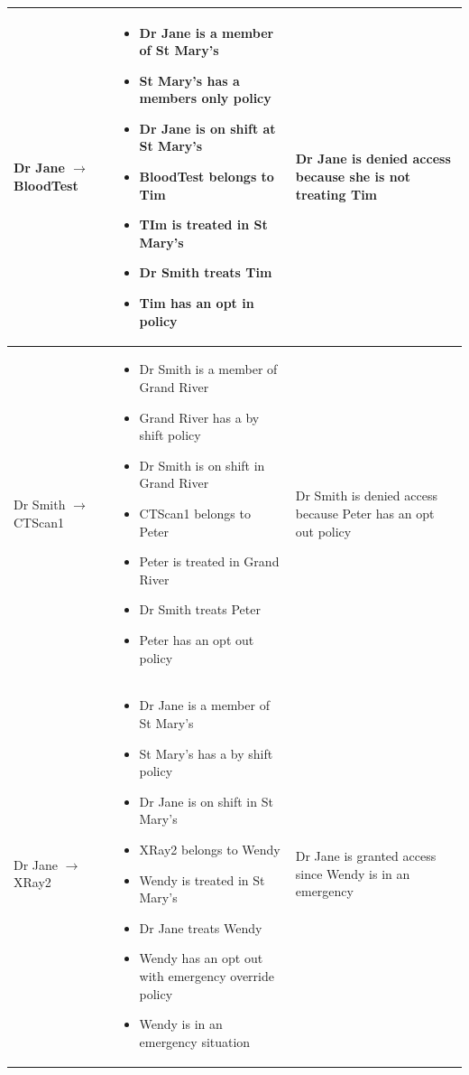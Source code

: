 \documentclass[conference]{IEEEtran}
\begin{document}
\begin{table}[!t]
{\begin{tabular}{m{3cm}|m{9cm}|m{5cm}}
\hline
Dr Jane $\rightarrow$ BloodTest & \begin{itemize}
                           \item Dr Jane is a member of St Mary's
\item St Mary's has a members only policy
\item Dr Jane is on shift at St Mary's
\item BloodTest belongs to Tim
\item TIm is treated in St Mary's
\item Dr Smith treats Tim
\item Tim has an opt in policy
                          \end{itemize} & Dr Jane is denied access because she is not treating Tim\\
\hline
Dr Smith $\rightarrow$ CTScan1 & \begin{itemize}
                                  \item Dr Smith is a member of Grand River
\item Grand River has a by shift policy
\item Dr Smith is on shift in Grand River
\item CTScan1 belongs to Peter
\item Peter is treated in Grand River
\item Dr Smith treats Peter
\item Peter has an opt out policy
                                 \end{itemize} & Dr Smith is denied access because Peter has an opt out policy\\
\hline
Dr Jane $\rightarrow$ XRay2 & \begin{itemize}
                               \item Dr Jane is a member of St Mary's
\item St Mary's has a by shift policy
\item Dr Jane is on shift in St Mary's
\item XRay2 belongs to Wendy
\item Wendy is treated in St Mary's
\item Dr Jane treats Wendy
\item Wendy has an opt out with emergency override policy
\item Wendy is in an emergency situation
                              \end{itemize} & Dr Jane is granted access since Wendy is in an emergency\\

\end{tabular}}
\end{table}
\end{document}
